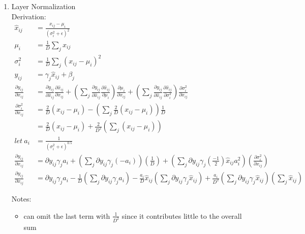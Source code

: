 \documentclass[12pt,letter]{article}
\begin{document}
\begin{enumerate}
\item Layer Normalization\\
  Derivation:
  \begin{align*}
    \hat{x}_{ij}&=\frac{x_{ij}-\mu_i}{(\sigma_i^2+\epsilon)^2}\\
    \mu_i&=\frac{1}{D}\sum_j x_{ij}\\
    \sigma_i^2&=\frac{1}{D}\sum_j (x_{ij}-\mu_i)^2\\
    y_{ij}&=\gamma_j \hat{x}_{ij} + \beta_j\\
    \frac{\partial y_{ij}}{\partial x_{ij}}&=\frac{\partial y_{ij}}{\partial \hat{x}_{ij}} \frac{\partial \hat{x}_{ij}}{\partial x_{ij}}
                                             + (\sum_j \frac{\partial y_{ij}}{\partial \hat{x}_{ij}} \frac{\partial \hat{x}_{ij}}{\partial \mu_i} ) \frac{\partial \mu_i}{\partial x_{ij}}
                                             + (\sum_j \frac{\partial y_{ij}}{\partial \hat{x}_{ij}} \frac{\partial \hat{x}_{ij}}{\partial \sigma_i^2}) \frac{\partial \sigma_i^2}{\partial x_{ij}}\\
    \frac{\partial \sigma_i^2}{\partial x_{ij}} &= \frac{2}{D}(x_{ij}-\mu_i) - (\sum_j \frac{2}{D}(x_{ij}-\mu_i))\frac{1}{D}\\
                &=\frac{2}{D}(x_{ij}-\mu_i) + \frac{2}{D^2}(\sum_j (x_{ij}-\mu_i))\\
    let\ a_i&= \frac{1}{(\sigma_i^2+\epsilon)^{0.5}}\\
    \frac{\partial y_{ij}}{\partial x_{ij}}&= \partial y_{ij} \gamma_j a_i
                                             + (\sum_j \partial y_{ij} \gamma_j (-a_i))(\frac{1}{D})
                                             + (\sum_j \partial y_{ij} \gamma_j (\frac{-1}{2}) \hat{x}_{ij} a_i^2)(\frac{\partial \sigma_i^2}{\partial x_{ij}})\\
    \frac{\partial y_{ij}}{\partial x_{ij}}&= \partial y_{ij} \gamma_j a_i
                                             - \frac{1}{D} (\sum_j \partial y_{ij} \gamma_j a_i)
                                             - \frac{a_i}{D}\hat{x}_{ij}(\sum_j \partial y_{ij} \gamma_j \hat{x}_{ij}) + \frac{a_i}{D^2}(\sum_j\partial y_{ij} \gamma_j \hat{x}_{ij}) (\sum_j \hat{x}_{ij})
  \end{align*}

  Notes:
  \begin{itemize}
    \item can omit the last term with $\frac{1}{D^2}$ since it contributes little to the overall sum
  \end{itemize}
    

\end{enumerate}
\end{document}
